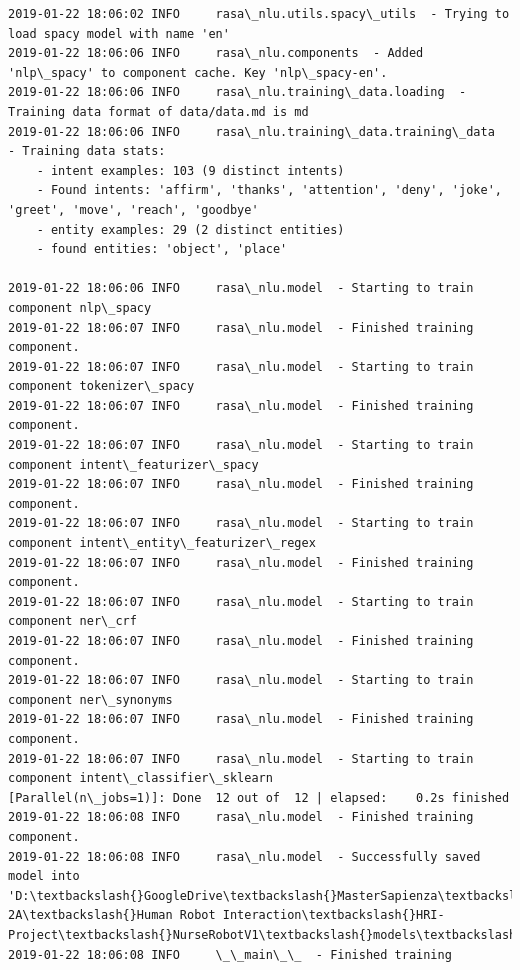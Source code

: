 \documentclass[11pt]{article}
\begin{document}
    \begin{Verbatim}[commandchars=\\\{\}]
2019-01-22 18:06:02 INFO     rasa\_nlu.utils.spacy\_utils  - Trying to load spacy model with name 'en'
2019-01-22 18:06:06 INFO     rasa\_nlu.components  - Added 'nlp\_spacy' to component cache. Key 'nlp\_spacy-en'.
2019-01-22 18:06:06 INFO     rasa\_nlu.training\_data.loading  - Training data format of data/data.md is md
2019-01-22 18:06:06 INFO     rasa\_nlu.training\_data.training\_data  - Training data stats: 
	- intent examples: 103 (9 distinct intents)
	- Found intents: 'affirm', 'thanks', 'attention', 'deny', 'joke', 'greet', 'move', 'reach', 'goodbye'
	- entity examples: 29 (2 distinct entities)
	- found entities: 'object', 'place'

2019-01-22 18:06:06 INFO     rasa\_nlu.model  - Starting to train component nlp\_spacy
2019-01-22 18:06:07 INFO     rasa\_nlu.model  - Finished training component.
2019-01-22 18:06:07 INFO     rasa\_nlu.model  - Starting to train component tokenizer\_spacy
2019-01-22 18:06:07 INFO     rasa\_nlu.model  - Finished training component.
2019-01-22 18:06:07 INFO     rasa\_nlu.model  - Starting to train component intent\_featurizer\_spacy
2019-01-22 18:06:07 INFO     rasa\_nlu.model  - Finished training component.
2019-01-22 18:06:07 INFO     rasa\_nlu.model  - Starting to train component intent\_entity\_featurizer\_regex
2019-01-22 18:06:07 INFO     rasa\_nlu.model  - Finished training component.
2019-01-22 18:06:07 INFO     rasa\_nlu.model  - Starting to train component ner\_crf
2019-01-22 18:06:07 INFO     rasa\_nlu.model  - Finished training component.
2019-01-22 18:06:07 INFO     rasa\_nlu.model  - Starting to train component ner\_synonyms
2019-01-22 18:06:07 INFO     rasa\_nlu.model  - Finished training component.
2019-01-22 18:06:07 INFO     rasa\_nlu.model  - Starting to train component intent\_classifier\_sklearn
[Parallel(n\_jobs=1)]: Done  12 out of  12 | elapsed:    0.2s finished
2019-01-22 18:06:08 INFO     rasa\_nlu.model  - Finished training component.
2019-01-22 18:06:08 INFO     rasa\_nlu.model  - Successfully saved model into 'D:\textbackslash{}GoogleDrive\textbackslash{}MasterSapienza\textbackslash{}Semestre1\textbackslash{}AI\textbackslash{}Sec 2A\textbackslash{}Human Robot Interaction\textbackslash{}HRI-Project\textbackslash{}NurseRobotV1\textbackslash{}models\textbackslash{}nursebot\textbackslash{}interpreter'
2019-01-22 18:06:08 INFO     \_\_main\_\_  - Finished training

    \end{Verbatim}
\end{document}
